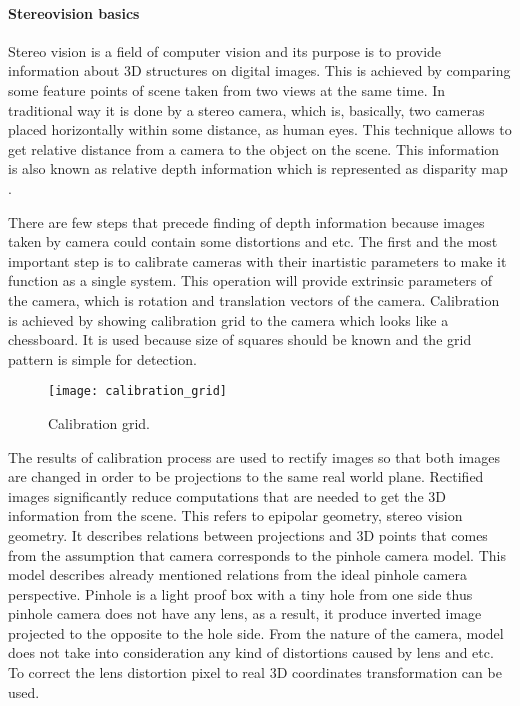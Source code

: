 \documentclass[../../../../main]{subfiles}
\begin{document}
\paragraph{Stereovision basics}

Stereo vision is a field of computer vision and its purpose is to provide information about 3D structures on digital images. This is achieved by comparing some feature points of scene taken from two views at the same time. In traditional way it is done by a stereo camera, which is, basically, two cameras placed horizontally within some distance, as human eyes. This technique allows to get relative distance from a camera to the object on the scene. This information is also known as relative depth information which is represented as disparity map \cite{Hartley2004}.

There are few steps that precede finding of depth information because images taken by camera could contain some distortions and etc. The first and the most important step is to calibrate cameras with their inartistic parameters to make it function as a single system. This operation will provide extrinsic parameters of the camera, which is rotation and translation vectors of the camera. Calibration is achieved by showing calibration grid to the camera which looks like a chessboard. It is used because size of squares should be known and the grid pattern is simple for detection.

\begin{figure} [ht]
    \begin{center}
        \texttt{[image: calibration\_grid]}
        \caption{Calibration grid.}
        \label{fig:calibrationGrid}
    \end{center}
\end{figure}

The results of calibration process are used to rectify images so that both images are changed in order to be projections to the same real world plane. Rectified images significantly reduce computations that are needed to get the 3D information from the scene. This refers to epipolar geometry, stereo vision geometry. It describes relations between projections and 3D points that comes from the assumption that camera corresponds to the pinhole camera model. This model describes already mentioned relations from the ideal pinhole camera perspective. Pinhole is a light proof box with a tiny hole from one side thus pinhole camera does not have any lens, as a result, it produce inverted image projected to the opposite to the hole side. From the nature of the camera, model does not take into consideration any kind of distortions caused by lens and etc. To correct the lens distortion pixel to real 3D coordinates transformation can be used.
\end{document}
